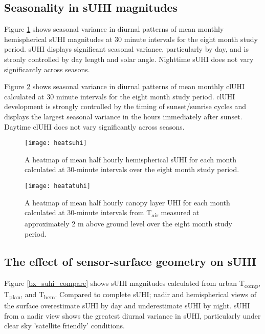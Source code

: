 \subsection{Seasonality in sUHI magnitudes}

Figure \ref{heatsuhi} shows seasonal variance in diurnal patterns of mean monthly hemispherical sUHI magnitudes at 30 minute intervals for the eight month study period. sUHI displays significant seasonal variance, particularly by day, and is stronly controlled by day length and solar angle. Nighttime sUHI does not vary significantly across seasons. 

Figure \ref{heatcluhi} shows seasonal variance in diurnal patterns of mean monthly clUHI calculated at 30 minute intervals for the eight month study period. clUHI development is strongly controlled by the timing of sunset/sunrise cycles and displays the largest seasonal variance in the hours immediately after sunset. Daytime clUHI does not vary significantly across seasons. 

\begin{figure}[H]
	\centering
	\texttt{[image: heatsuhi]}
	\caption{A heatmap of mean half hourly hemispherical sUHI for each month calculated at 30-minute intervals over the eight month study period.}
	\label{heatsuhi}
\end{figure}

\begin{figure}[H]
	\centering
	\texttt{[image: heatatuhi]}
	\caption{A heatmap of mean half hourly canopy layer UHI for each month calculated at 30-minute intervals from T\textsubscript{air} measured at approximately 2 \si{\meter} above ground level over the eight month study period.}
	\label{heatcluhi}
\end{figure}

\subsection{The effect of sensor-surface geometry on sUHI}

Figure \ref{bx_suhi_compare} shows sUHI magnitudes calculated from urban T\textsubscript{comp}, T\textsubscript{plan}, and T\textsubscript{hem}. Compared to complete sUHI; nadir and hemispherical views of the surface overestimate sUHI by day and underestimate sUHI by night. sUHI from a nadir view shows the greatest diurnal variance in sUHI, particularly under clear sky 'satellite friendly' conditions. 

